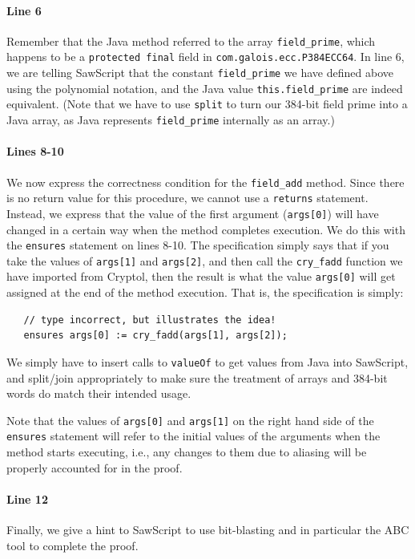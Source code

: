 \documentclass[12pt]{galois-whitepaper}
\newcommand{\sawScript}{{\sc SawScript}\xspace}
\begin{document}
\paragraph{Line 6} Remember that the Java method referred to the array {\tt field\_prime}, which happens to be a {\tt protected final}
field in {\tt com.galois.ecc.P384ECC64}. In line 6, we are telling \sawScript that the constant {\tt field\_prime}
we have defined above using the polynomial notation, and the Java value {\tt this.field\_prime} are indeed equivalent.
(Note that we have to use {\tt split} to turn our 384-bit field prime into a Java array, as Java represents {\tt field\_prime}
internally as an array.)

\paragraph{Lines 8-10} We now express the correctness condition for the {\tt field\_add} method. Since there is no return value for this
procedure, we cannot use a {\tt returns} statement. Instead, we express that the value of the first argument ({\tt args[0]}) will have 
changed in a certain way when the method completes execution. We do this with the {\tt ensures} statement on lines 8-10.
The specification simply says that if you take the values of {\tt args[1]} and
{\tt args[2]}, and then call the {\tt cry\_fadd} function we have imported from Cryptol,
then the result is what the value {\tt args[0]} will get assigned at the end of the method execution. That is, the
specification is simply:
\begin{Verbatim}
   // type incorrect, but illustrates the idea!
   ensures args[0] := cry_fadd(args[1], args[2]);
\end{Verbatim}
We simply have to insert calls to {\tt valueOf} to get values from Java into \sawScript, and split/join appropriately
to make sure the treatment of arrays and 384-bit words do match their intended usage. 

Note that the values of {\tt args[0]} and {\tt args[1]}
on the right hand side of the {\tt ensures} statement will refer to the initial values of the arguments when the method starts executing,
i.e., any changes to them due to aliasing will be properly accounted for in the proof.

\paragraph{Line 12} Finally, we give a hint to \sawScript to use bit-blasting and in particular the ABC tool to complete the proof. 
\end{document}
